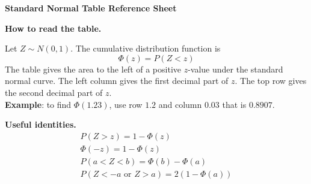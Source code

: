 \documentclass[11pt]{article}
\begin{document}
	
	\begin{center}
		{\Large\textbf{Standard Normal Table Reference Sheet}}
	\end{center}
	
	\vspace{0.1cm}
	
	\noindent
	\begin{minipage}[t]{0.68\textwidth}
		\vspace{0pt}
		
		\textbf{How to read the table.}
		
		Let \(Z\sim N(0,1)\). The cumulative distribution function is
		\[
		\Phi(z)=P(Z<z)
		\]
		The table gives the area to the left of a positive \(z\)-value under the standard normal curve. The left column gives the first decimal part of \(z\). The top row gives the second decimal part of \(z\). \\
		
		\textbf{Example}: to find \(\Phi(1.23)\), use row \(1.2\) and column \(0.03\) that is  \(0.8907\).
	\end{minipage}%
	\hfill
	\begin{minipage}[t]{0.28\textwidth}
		\vspace{0pt}
		
		\textbf{Useful identities.}
		\begin{gather*}
			P(Z>z)=1-\Phi(z)\\
			\Phi(-z)=1-\Phi(z)\\
			P(a<Z<b)=\Phi(b)-\Phi(a)\\
			P(Z<-a\text{ or }Z>a)=2(1-\Phi(a))
		\end{gather*}
	\end{minipage}
	
\end{document}
